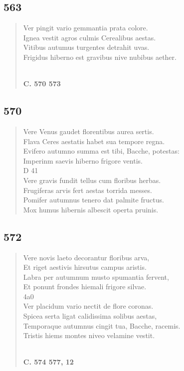 \documentclass[11pt, a4paper]{report}
\begin{document}
            \subsection*{563}
      \begin{verse}
      Ver pingit vario gemmantia prata colore. \\ Ignea vestit agros culmis Cerealibus aestas. \\ Vitibus autumus turgentes detrahit uvas. \\ Frigidus hiberno est gravibus nive nubibus aether. \\ 
        ﻿\pagebreak 
    \begin{center} \textbf{C. 570 573} \end{center}
      \end{verse}
  
            \subsection*{570}
      \begin{verse}
      Vere Venus gaudet florentibus aurea sertis. \\ Flava Ceres aestatis habet sua tempore regna. \\ Evifero autumno summa est tibi, Bacche, potestas: \\ Imperinm saevis hiberno frigore ventis. \\ D 41 \\ Vere gravis fundit tellus cum floribus herbas. \\ Frugiferas arvis fert aestas torrida messes. \\ Pomifer autumnus tenero dat palmite fructus. \\ Mox humus hibernis albescit operta pruinis. \\ 
      \end{verse}
  
            \subsection*{572}
      \begin{verse}
      Vere novis laeto decorantur floribus arva, \\ Et riget aestivis hirsutus campus aristis. \\ Labra per autumnum musto spumantia fervent, \\ Et ponunt frondes hiemali frigore silvae. \\ 4a0 \\ Ver placidum vario nectit de flore coronas. \\ Spicea serta ligat calidissima solibus aestas, \\ Temporaque autumnus cingit tua, Bacche, racemis. \\ Tristis hiems montes niveo velamine vestit. \\ 
        ﻿\pagebreak 
    \begin{center} \textbf{C. 574 577, 12} \end{center}
      \end{verse}
  
\end{document}

